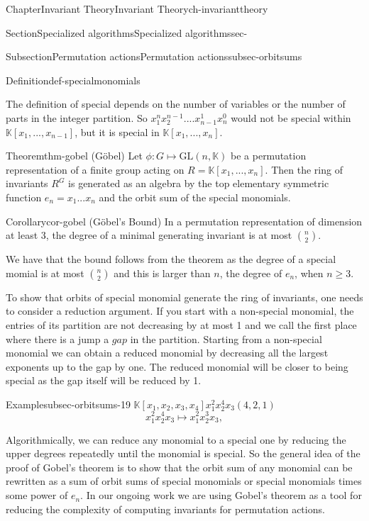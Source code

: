\documentclass[oneside,10pt,]{book}
\begin{document}
\begin{chapterptx}{Chapter}{Invariant Theory}{}{Invariant Theory}{}{}{ch-invarianttheory}
\begin{sectionptx}{Section}{Specialized algorithms}{}{Specialized algorithms}{}{}{sec-}
\begin{subsectionptx}{Subsection}{Permutation actions}{}{Permutation actions}{}{}{subsec-orbitsums}
\begin{definition}{Definition}{}{def-specialmonomials}
\end{definition}
The definition of special depends on the number of variables or the number of parts in the integer partition. So \(x_1^n x_2^{n-1}....x_{n-1}^1 x_n^0\) would not be special within \(\mathbb{K}[x_1, ... , x_{n-1}]\), but it is special in \(\mathbb{K}[x_1, ... , x_{n}]\).%
\begin{theorem}{Theorem}{}{}{thm-gobel}%
(Göbel) Let \(\phi:G \mapsto \text{GL}(n,\mathbb{K})\) be a permutation representation of a finite group acting on \(R = \mathbb{K}[x_1,...,x_n]\). Then the ring of invariants \(R^G\) is generated as an algebra by the top elementary symmetric function \(e_n = x_1...x_n\) and the orbit sum of the special monomials.%
\end{theorem}
\begin{corollary}{Corollary}{}{}{cor-gobel}%
(Göbel's Bound) In a permutation representation of dimension at least 3, the degree of a minimal generating invariant is at most \(\binom{n}{2}\).%
\end{corollary}
We have that the bound follows from the theorem as the degree of a special momial is at most \(\binom{n}{2}\) and this is larger than \(n\), the degree of \(e_n\), when \(n \geq 3\).%
\par
To show that orbits of special monomial generate the ring of invariants, one needs to consider a reduction argument. If you start with a non-special monomial, the entries of its partition are not decreasing by at most 1 and we call the first place where there is a jump a \(gap\) in the partition. Starting from a non-special monomial we can obtain a reduced monomial by decreasing all the largest exponents up to the gap by one. The reduced monomial will be closer to being special as the gap itself will be reduced by 1.%
\begin{example}{Example}{}{subsec-orbitsums-19}%
\(\mathbb{K}[x_1,x_2,x_3,x_4]\)\(x_1^2x_2^4x_3 \)\((4,2,1)\)%
\begin{equation*}
x_1^2x_2^4x_3 \mapsto x_1^2x_2^3 x_3,
\end{equation*}
\end{example}
Algorithmically, we can reduce any monomial to a special one by reducing the upper degrees repeatedly until the monomial is special. So the general idea of the proof of Gobel's theorem is to show that the orbit sum of any monomial can be rewritten as a sum of orbit sums of special monomials or special monomials times some power of \(e_n\). In our ongoing work we are using Gobel's theorem as a tool for reducing the complexity of computing invariants for permutation actions.%

\end{subsectionptx}
\end{sectionptx}
\end{chapterptx}
\end{document}
